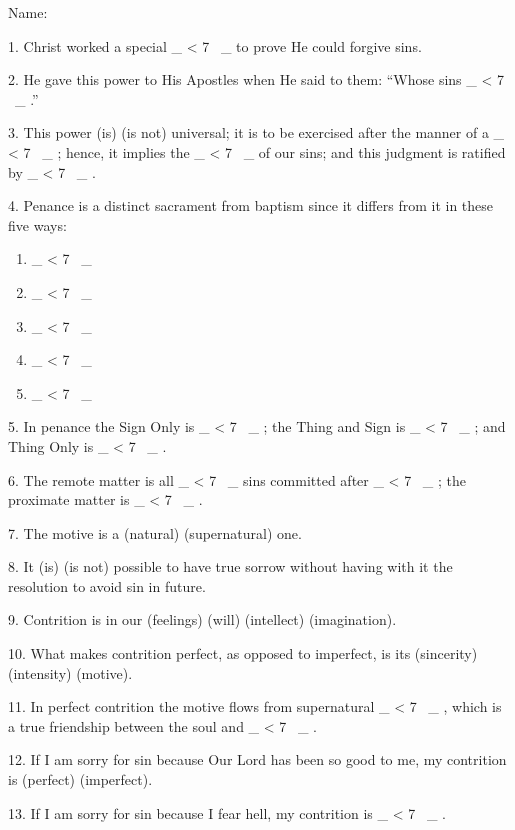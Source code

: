 \documentclass[a5paper]{article}
\title{}
\newcommand\textjarman[1]{{\jarman #1}}
\newcounter{z}
\newcommand\spaces[1]{ \_\loop \ifnum\value{z} < #1
~\_%
\stepcounter{z}%
\repeat%
\setcounter{z}{0}}
\begin{document}
\setlength{\parskip}{6pt plus2pt minus2pt}


\noindent Name:


1. Christ worked a special \spaces{7} to prove He could forgive sins.

2. He gave this power to His Apostles when He said to them: “Whose sins \spaces{7}.”

3. This power (\textjarman{is}) (\textjarman{is not}) universal; it is to be exercised after the manner of a \spaces{7}; hence, it implies the \spaces{7} of our sins; and this judgment is ratified by \spaces{7}.

4. Penance is a distinct sacrament from baptism since it differs from it in these five ways: 
\begin{enumerate}
\item \spaces{7}
\item \spaces{7}
\item \spaces{7}
\item \spaces{7}
\item \spaces{7}
\end{enumerate}

5. In penance the Sign Only is \spaces{7}; the Thing and Sign is \spaces{7}; and Thing Only is \spaces{7}.

6. The remote matter is all \spaces{7} sins committed after \spaces{7}; the proximate matter is \spaces{7}.

7. The motive is a (\textjarman{natural}) (\textjarman{supernatural}) one.

8. It (\textjarman{is}) (\textjarman{is not}) possible to have true sorrow without having with it the resolution to avoid sin in future.

9. Contrition is in our (\textjarman{feelings}) (\textjarman{will}) (\textjarman{intellect}) (\textjarman{imagination}).

10. What makes contrition perfect, as opposed to imperfect, is its (\textjarman{sincerity}) (\textjarman{intensity}) (\textjarman{motive}).

11. In perfect contrition the motive flows from supernatural \spaces{7}, which is a true friendship between the soul and \spaces{7}.

12. If I am sorry for sin because Our Lord has been so good to me, my contrition is (\textjarman{perfect}) (\textjarman{imperfect}).

13. If I am sorry for sin because I fear hell, my contrition is \spaces{7}.
\end{document}

